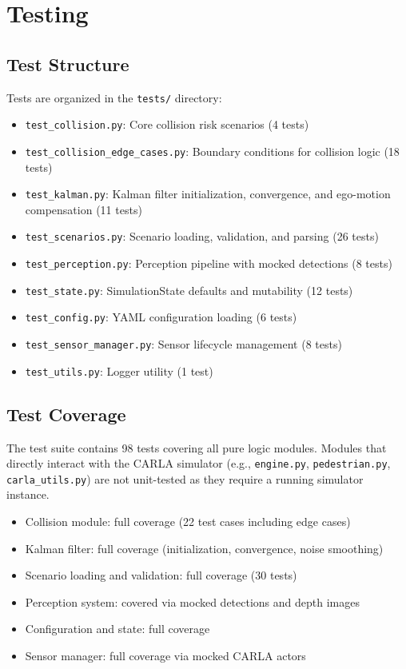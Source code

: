 \section{Testing}

\subsection{Test Structure}

Tests are organized in the \texttt{tests/} directory:

\begin{itemize}
    \item \texttt{test\_collision.py}: Core collision risk scenarios (4 tests)
    \item \texttt{test\_collision\_edge\_cases.py}: Boundary conditions for collision logic (18 tests)
    \item \texttt{test\_kalman.py}: Kalman filter initialization, convergence, and ego-motion compensation (11 tests)
    \item \texttt{test\_scenarios.py}: Scenario loading, validation, and parsing (26 tests)
    \item \texttt{test\_perception.py}: Perception pipeline with mocked detections (8 tests)
    \item \texttt{test\_state.py}: SimulationState defaults and mutability (12 tests)
    \item \texttt{test\_config.py}: YAML configuration loading (6 tests)
    \item \texttt{test\_sensor\_manager.py}: Sensor lifecycle management (8 tests)
    \item \texttt{test\_utils.py}: Logger utility (1 test)
\end{itemize}

\subsection{Test Coverage}

The test suite contains 98 tests covering all pure logic modules. Modules that directly interact with the CARLA simulator (e.g., \texttt{engine.py}, \texttt{pedestrian.py}, \texttt{carla\_utils.py}) are not unit-tested as they require a running simulator instance.

\begin{itemize}
    \item Collision module: full coverage (22 test cases including edge cases)
    \item Kalman filter: full coverage (initialization, convergence, noise smoothing)
    \item Scenario loading and validation: full coverage (30 tests)
    \item Perception system: covered via mocked detections and depth images
    \item Configuration and state: full coverage
    \item Sensor manager: full coverage via mocked CARLA actors
\end{itemize}

